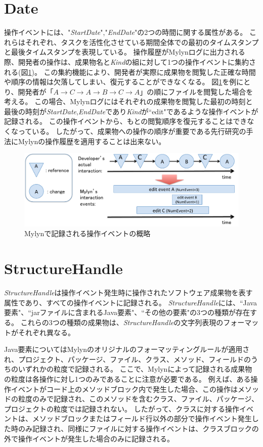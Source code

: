 \documentclass[a4paper]{jsbook}
\def\ra{\rightarrow}
\begin{document}
\section{Date}\label{date_sec}
操作イベントには、"{\it StartDate}","{\it EndDate}"の2つの時間に関する属性がある。
これらはそれぞれ、タスクを活性化させている期間全体での最初のタイムスタンプと最後タイムスタンプを表現している。
操作履歴がMylynログに出力される際、開発者の操作は、成果物名と{\it Kind}の組に対して1つの操作イベントに集約される(図\ref{mylyn_interaction})。
この集約機能により、開発者が実際に成果物を閲覧した正確な時間や順序の情報は欠落してしまい、復元することができなくなる。
図\ref{mylyn_interaction}を例にとり、開発者が「$A\ra C \ra A \ra B \ra C \ra A$」の順にファイルを閲覧した場合を考える。
この場合、Mylynログにはそれぞれの成果物を閲覧した最初の時刻と最後の時刻が{\it StartDate},{\it EndDate}であり{\it Kind}が``edit"であるような操作イベントが記録される。
この操作イベントから、もとの閲覧順序を復元することはできなくなっている。
したがって、成果物への操作の順序が重要である先行研究\cite{6233415,KatoJapanese:2011,ss2012-76,ss2013-84,Yamamori:2016}の手法にMylynの操作履歴を適用することは出来ない。
\begin{figure}[tb]
  \centering
  \includegraphics[width = \linewidth]{resource/mylyn_interaction.pdf}
  \caption{Mylynで記録される操作イベントの概略}
  \label{mylyn_interaction}
\end{figure}
\section{StructureHandle}
{\it StructureHandle}は操作イベント発生時に操作されたソフトウェア成果物を表す属性であり、すべての操作イベントに記録される。
{\it StructureHandle}には、``Java要素"、``jarファイルに含まれるJava要素"、``その他の要素"の3つの種類が存在する。
これらの3つの種類の成果物は、{\it StructureHandle}の文字列表現のフォーマットがそれぞれ異なる。

Java要素についてはMylynのオリジナルのフォーマッティングルールが適用され、プロジェクト、パッケージ、ファイル、クラス、メソッド、フィールドのうちのいずれかの粒度で記録される。
ここで、Mylynによって記録される成果物の粒度は各操作に対し1つのみであることに注意が必要である。
例えば、ある操作イベントがコード上のメソッドブロック内で発生した場合、この操作はメソッドの粒度のみで記録され、このメソッドを含むクラス、ファイル、パッケージ、プロジェクトの粒度では記録されない。
したがって、クラスに対する操作イベントは、メソッドブロックまたはフィールド行以外の部分で操作イベント発生した時のみ記録され、同様にファイルに対する操作イベントは、クラスブロックの外で操作イベントが発生した場合のみに記録される。
\end{document}
